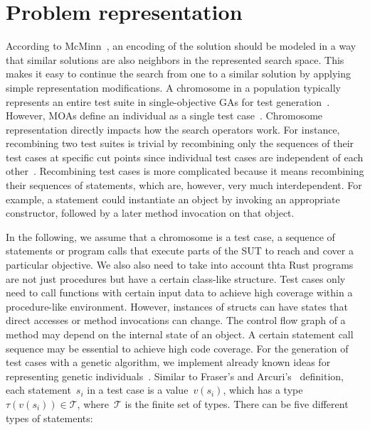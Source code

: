 \documentclass[paper=a4,%
  twoside,%
  BCOR4mm,%
  abstract=true,%
  toc=bibliography,%
  chapterprefix=true,%
  toc=bibliographynumbered,%
  open=right,%
  english,%
  pagesize=pdftex]{scrreprt}
\newcommand{\sut}{\ac{SUT}\xspace}
\begin{document}
\section{Problem representation}
\label{sec:problem-representation}
According to McMinn~\cite{McMinn_2004}, an encoding of the solution should be modeled in a way that similar solutions are also neighbors in the represented search space. This makes it easy to continue the search from one to a similar solution by applying simple representation modifications. A chromosome in a population typically represents an entire test suite in single-objective \acp{GA} for test generation~\cite{Fraser_2011a, Campos2017}. However, \acp{MOA} define an individual as a single test case~\cite{Panichella2018}. Chromosome representation directly impacts how the search operators work. For instance, recombining two test suites is trivial by recombining only the sequences of their test cases at specific cut points since individual test cases are independent of each other~\cite{Fraser_2013}. Recombining test cases is more complicated because it means recombining their sequences of statements, which are, however, very much interdependent. For example, a statement could instantiate an object by invoking an appropriate constructor, followed by a later method invocation on that object. 

In the following, we assume that a chromosome is a test case, a sequence of statements or program calls that execute parts of the \sut to reach and cover a particular objective. We also also need to take into account thta Rust programs are not just procedures but have a certain class-like structure. Test cases only need to call functions with certain input data to achieve high coverage within a procedure-like environment. However, instances of structs can have states that direct accesses or method invocations can change. The control flow graph of a method may depend on the internal state of an object. A certain statement call sequence may be essential to achieve high code coverage. For the generation of test cases with a genetic algorithm, we implement already known ideas for representing genetic individuals~\cite{Fraser2012,Tonella2004,Arcuri2008}. Similar to Fraser's and Arcuri's~\cite{Fraser_2011a} definition, each statement~$s_i$ in a test case is a value~$v(s_i)$, which has a type~$\tau(v(s_i)) \in \mathcal{T}$, where~$\mathcal{T}$ is the finite set of types. There can be five different types of statements:
\end{document}
